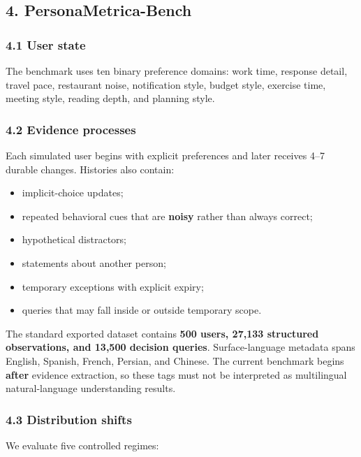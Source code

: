 \subsection{4. PersonaMetrica-Bench}\label{personametrica-bench}

\subsubsection{4.1 User state}\label{user-state}

The benchmark uses ten binary preference domains: work time, response
detail, travel pace, restaurant noise, notification style, budget style,
exercise time, meeting style, reading depth, and planning style.

\subsubsection{4.2 Evidence processes}\label{evidence-processes}

Each simulated user begins with explicit preferences and later receives
4--7 durable changes. Histories also contain:

\begin{itemize}
\tightlist
\item
  implicit-choice updates;
\item
  repeated behavioral cues that are \textbf{noisy} rather than always
  correct;
\item
  hypothetical distractors;
\item
  statements about another person;
\item
  temporary exceptions with explicit expiry;
\item
  queries that may fall inside or outside temporary scope.
\end{itemize}

The standard exported dataset contains \textbf{500 users, 27,133
structured observations, and 13,500 decision queries}. Surface-language
metadata spans English, Spanish, French, Persian, and Chinese. The
current benchmark begins \textbf{after} evidence extraction, so these
tags must not be interpreted as multilingual natural-language
understanding results.

\subsubsection{4.3 Distribution shifts}\label{distribution-shifts}

We evaluate five controlled regimes:

